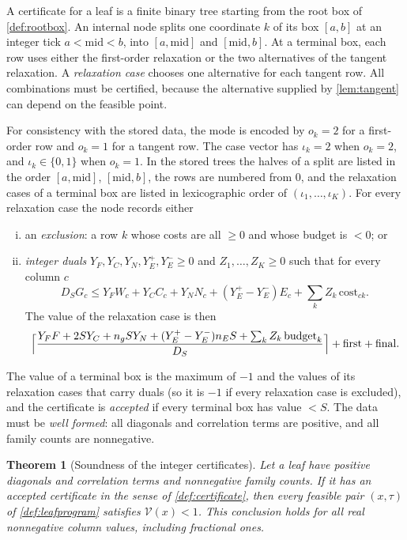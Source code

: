 \documentclass[11pt]{amsart}
\numberwithin{equation}{section}
\theoremstyle{plain}
\newtheorem{theorem}{Theorem}[section]
\theoremstyle{definition}
\theoremstyle{remark}
\newcommand{\1}{\mathbf{1}}
\begin{document}
\begin{definition}[Certificate]\label{def:certificate}
A certificate for a leaf is a finite binary tree starting from the root box of
\cref{def:rootbox}. An internal node splits one coordinate $k$ of
its box $[a,b]$ at an integer tick $a<\mathrm{mid}<b$, into $[a,\mathrm{mid}]$ and
$[\mathrm{mid},b]$. At a terminal box, each row uses either the first-order relaxation
or the two alternatives of the tangent relaxation. A \emph{relaxation case} chooses one
alternative for each tangent row. All combinations must be certified, because the
alternative supplied by \cref{lem:tangent} can depend on the feasible point.

For consistency with the stored data, the mode is encoded by $o_k=2$ for a first-order
row and $o_k=1$ for a tangent row. The case vector has $\iota_k=2$ when $o_k=2$, and
$\iota_k\in\{0,1\}$ when $o_k=1$. In the stored trees the halves of a split are listed in the
order $[a,\mathrm{mid}]$, $[\mathrm{mid},b]$, the rows are numbered from $0$, and the relaxation
cases of a terminal box are listed in lexicographic order of $(\iota_1,\dots,\iota_K)$.
For every relaxation case the node records either
\begin{enumerate}[(i)]
  \item an \emph{exclusion}: a row $k$ whose costs are all $\ge0$ and whose budget is $<0$; or
  \item \emph{integer duals} $Y_F,Y_C,Y_N,Y_E^+,Y_E^-\ge0$ and $Z_1,\dots,Z_K\ge0$ such that for every
    column $c$
    \begin{equation}\label{eq:dualfeasible}
      D_SG_c\le Y_FW_c+Y_CC_c+Y_NN_c+(Y_E^+-Y_E^-)E_c+\sum_kZ_k\,\mathrm{cost}_{ck}.
    \end{equation}
    The value of the relaxation case is then
    \[
      \Bigl\lceil\frac{Y_FF+2SY_C+n_gSY_N+(Y_E^+-Y_E^-)n_ES+\sum_kZ_k\,\mathrm{budget}_k}{D_S}\Bigr\rceil
      +\mathrm{first}+\mathrm{final}.
    \]
\end{enumerate}
The value of a terminal box is the maximum of $-1$ and the values of its relaxation cases that
carry duals (so it is $-1$ if every relaxation case is excluded), and
the certificate is \emph{accepted} if every terminal box has value $<S$. The data must be
\emph{well formed}: all diagonals and correlation terms are positive, and all family counts are
nonnegative.
\end{definition}

\begin{theorem}[Soundness of the integer certificates]\label{thm:certificate}
Let a leaf have positive diagonals and correlation terms and nonnegative family counts. If it has
an accepted certificate in the sense of \cref{def:certificate}, then every feasible
pair $(x,\tau)$ of \cref{def:leafprogram} satisfies $\mathcal V(x)<1$.
This conclusion holds for all real nonnegative column values, including fractional ones.
\end{theorem}
\end{document}
